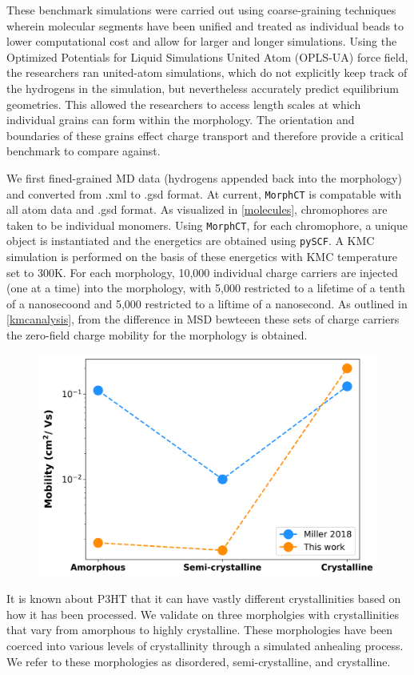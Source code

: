 These benchmark simulations were carried out using coarse-graining techniques
wherein molecular segments have been unified and treated as individual beads to lower
computational cost and allow for larger and longer simulations. 
Using the Optimized Potentials for Liquid Simulations United Atom (OPLS-UA) force field,
the researchers ran united-atom simulations, which do
not explicitly keep track of the hydrogens in the simulation, 
but nevertheless accurately predict equilibrium geometries. This allowed the researchers to access length scales
at which individual grains can form within the morphology. The orientation and boundaries of these grains effect
charge transport and therefore provide a critical benchmark to compare against. 

We first fined-grained MD data (hydrogens appended back into
the morphology) and converted from .xml to .gsd format. At current, \texttt{MorphCT} is compatable with all atom data
and .gsd format. As visualized in \autoref{molecules}, chromophores are taken to be individual monomers. 
Using \texttt{MorphCT}, for each chromophore, a unique object is instantiated and the energetics are obtained using
\texttt{pySCF}. A KMC simulation is performed on the basis of these energetics with KMC temperature set to 300K. For
each morphology, 10,000 individual charge carriers are injected (one at a time) into the morphology, with
5,000 restricted to a lifetime of a tenth of a nanosecoond and 5,000 restricted to a liftime of a nanosecond.
As outlined in \autoref{kmcanalysis}, from the difference in MSD bewteeen these sets of charge carriers the
zero-field charge mobility for the morphology is obtained. 

\begin{figure}
  \center
  \includegraphics[width = .6\textwidth]{figures/validation.png}
  \caption{}
  \label{mobility-validation}
\end{figure}

It is known about P3HT that it can have vastly different crystallinities based on how it has been processed. 
We validate on three morpholgies with crystallinities that vary from amorphous to highly crystalline. These morphologies have been coerced into various levels of crystallinity through a simulated anhealing process. 
We refer to these morphologies as disordered, semi-crystalline, and crystalline.

